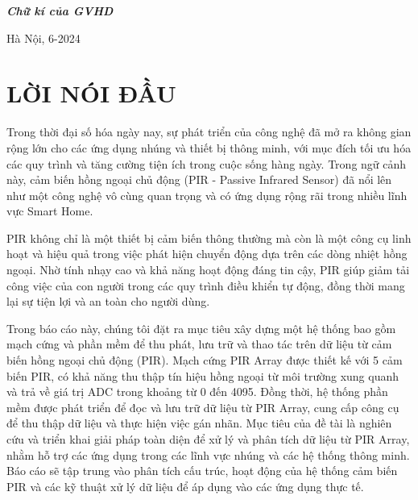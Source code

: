\documentclass{article}
\begin{document}
\begin{titlepage}
\begin{tabular}{l l}
\end{tabular}

\hspace{9cm} \textit{\textbf{\fontsize{14pt}{0pt}\selectfont Chữ kí của GVHD\\}}
\vspace{3cm}
\begin{center}
    \fontsize{14pt}{0pt}\selectfont Hà Nội, 6-2024
\end{center}
\end{titlepage}
\cleardoublepage
\section*{LỜI NÓI ĐẦU}
\thispagestyle{empty}

Trong thời đại số hóa ngày nay, sự phát triển của công nghệ đã mở ra không gian rộng lớn cho các ứng dụng nhúng và thiết bị thông minh, với mục đích tối ưu hóa các quy trình và tăng cường tiện ích trong cuộc sống hàng ngày. Trong ngữ cảnh này, cảm biến hồng ngoại chủ động (PIR - Passive Infrared Sensor) đã nổi lên như một công nghệ vô cùng quan trọng và có ứng dụng rộng rãi trong nhiều lĩnh vực Smart Home.

PIR không chỉ là một thiết bị cảm biến thông thường mà còn là một công cụ linh hoạt và hiệu quả trong việc phát hiện chuyển động dựa trên các dòng nhiệt hồng ngoại. Nhờ tính nhạy cao và khả năng hoạt động đáng tin cậy, PIR giúp giảm tải công việc của con người trong các quy trình điều khiển tự động, đồng thời mang lại sự tiện lợi và an toàn cho người dùng.

Trong báo cáo này, chúng tôi đặt ra mục tiêu xây dựng một hệ thống bao gồm mạch cứng và phần mềm để thu phát, lưu trữ và thao tác trên dữ liệu từ cảm biến hồng ngoại chủ động (PIR). Mạch cứng PIR Array được thiết kế với 5 cảm biến PIR, có khả năng thu thập tín hiệu hồng ngoại từ môi trường xung quanh và trả về giá trị ADC trong khoảng từ 0 đến 4095. Đồng thời, hệ thống phần mềm được phát triển để đọc và lưu trữ dữ liệu từ PIR Array, cung cấp công cụ để thu thập dữ liệu và thực hiện việc gán nhãn. Mục tiêu của đề tài là nghiên cứu và triển khai giải pháp toàn diện để xử lý và phân tích dữ liệu từ PIR Array, nhằm hỗ trợ các ứng dụng trong các lĩnh vực nhúng và các hệ thống thông minh. Báo cáo sẽ tập trung vào phân tích cấu trúc, hoạt động của hệ thống cảm biến PIR và các kỹ thuật xử lý dữ liệu để áp dụng vào các ứng dụng thực tế.

\vspace{2cm}
\end{document}
